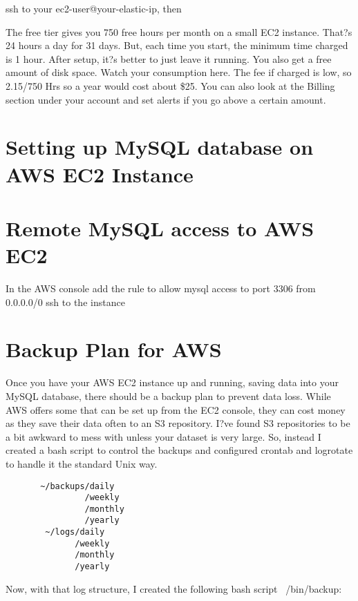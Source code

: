 \documentclass[final,letterpaper,12pt]{article}
\begin{document}
ssh to your ec2-user@your-elastic-ip, then

The free tier gives you 750 free hours per month on a small EC2 instance. That?s 24 hours a day for 31 days. But, each time you start, the minimum time charged is 1 hour. After setup, it?s better to just leave it running. You also get a free amount of disk space. Watch your consumption here. The fee if charged is low, so
2.15/750 Hrs so a year would cost about \$25. You can also look at the Billing section under your account and set alerts if you go above a certain amount.
\section{Setting up MySQL database on AWS EC2 Instance}



\section{Remote MySQL access to AWS EC2}

\noindent In the AWS console add the rule to allow mysql access to port 3306 from 0.0.0.0/0
ssh to the instance




\section{Backup Plan for AWS}
\noindent Once you have your AWS EC2 instance up and running, saving data into your MySQL database, there should be a backup plan to prevent data loss. While AWS offers some that can be set up from the EC2 console, they can cost money as they save their data often to an S3 repository. I?ve found S3 repositories to be a bit awkward to mess with unless your dataset is very large. So, instead I created a bash script to control the backups and configured crontab and logrotate to handle it the standard Unix way.
\begin{verbatim}
       ~/backups/daily
                /weekly
                /monthly
                /yearly
        ~/logs/daily
              /weekly
              /monthly
              /yearly
\end{verbatim}
\smallskip
\noindent Now, with that log structure, I created the following bash script ~/bin/backup:


\end{document}

